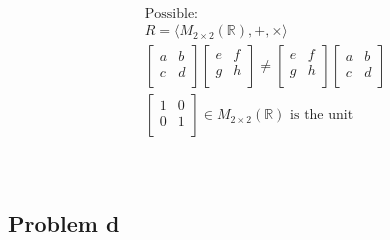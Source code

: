 \documentclass{article}
\begin{document}
\begin{align*}
    &\text{Possible}:\\
    &R=\langle M_{2\times 2}(\mathbb{R} ),+,\times\rangle\\
    &\begin{bmatrix}
        a&b\\
        c&d\\
    \end{bmatrix}\begin{bmatrix}
        e&f\\
        g&h\\
    \end{bmatrix}\ne\begin{bmatrix}
        e&f\\
        g&h\\
    \end{bmatrix}\begin{bmatrix}
        a&b\\
        c&d\\
    \end{bmatrix}\\
    &\begin{bmatrix}
        1&0\\
        0&1\\
    \end{bmatrix}\in M_{2\times 2}(\mathbb{R} )\text{ is the unit}\\
\end{align*}

~

\subsection*{Problem d}

~
\end{document}
